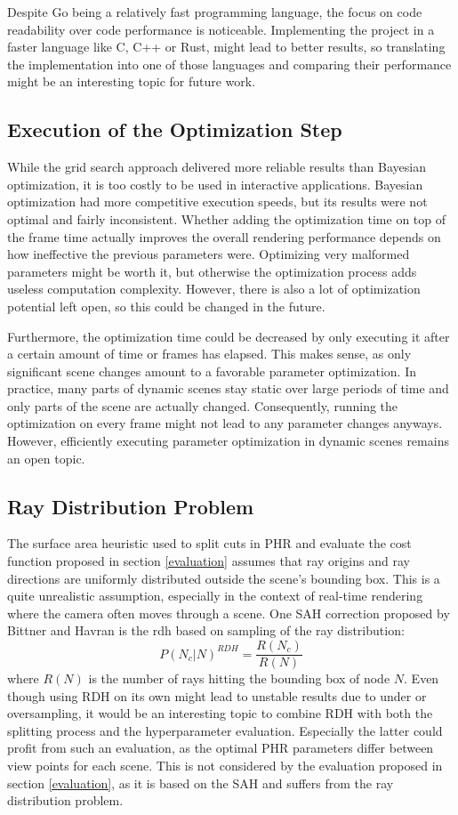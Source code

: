 Despite Go being a relatively fast programming language, the focus on code readability over code performance is noticeable. Implementing the project in a faster language like C, C++ or Rust, might lead to better results, so translating the implementation into one of those languages and comparing their performance might be an interesting topic for future work. 
\subsection{Execution of the Optimization Step}
\label{discussion_execute}
While the grid search approach delivered more reliable results than Bayesian optimization, it is too costly to be used in interactive applications. Bayesian optimization had more competitive execution speeds, but its results were not optimal and fairly inconsistent. Whether adding the optimization time on top of the frame time actually improves the overall rendering performance depends on how ineffective the previous parameters were. Optimizing very malformed parameters might be worth it, but otherwise the optimization process adds useless computation complexity. However, there is also a lot of optimization potential left open, so this could be changed in the future.

Furthermore, the optimization time could be decreased by only executing it after a certain amount of time or frames has elapsed.  This makes sense, as only significant scene changes amount to a favorable parameter optimization. In practice, many parts of dynamic scenes stay static over large periods of time and only parts of the scene are actually changed. Consequently, running the optimization on every frame might not lead to any parameter changes anyways. However, efficiently executing parameter optimization in dynamic scenes remains an open topic.
\subsection{Ray Distribution Problem}
The surface area heuristic used to split cuts in PHR and evaluate the cost function proposed in section \ref{evaluation} assumes that ray origins and ray directions are uniformly distributed outside the scene's bounding box. This is a quite unrealistic assumption, especially in the context of real-time rendering where the camera often moves through a scene. One SAH correction proposed by Bittner and Havran\cite{bittner09rdh} is the \acrlong{rdh} based on sampling of the ray distribution:
\[
    P(N_c|N)^{RDH}=\frac{R(N_c)}{R(N)}
\]
where $R(N)$ is the number of rays hitting the bounding box of node $N$. Even though using RDH on its own might lead to unstable results due to under or oversampling, it would be an interesting topic to combine RDH with both the splitting process and the hyperparameter evaluation. Especially the latter could profit from such an evaluation, as the optimal PHR parameters differ between view points for each scene.
This is not considered by the evaluation proposed in section \ref{evaluation}, as it is based on the SAH and suffers from the ray distribution problem.
\cleardoublepage